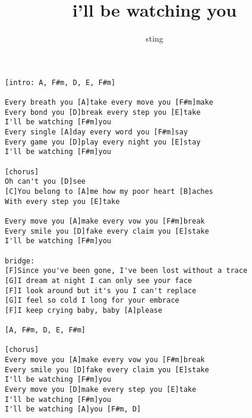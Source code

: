 \author{sting}
\title{i'll be watching you}
\maketitle
\begin{verbatim}
[intro: A, F#m, D, E, F#m]

Every breath you [A]take every move you [F#m]make
Every bond you [D]break every step you [E]take
I'll be watching [F#m]you
Every single [A]day every word you [F#m]say
Every game you [D]play every night you [E]stay
I'll be watching [F#m]you

[chorus]
Oh can't you [D]see
[C]You belong to [A]me how my poor heart [B]aches
With every step you [E]take

Every move you [A]make every vow you [F#m]break
Every smile you [D]fake every claim you [E]stake
I'll be watching [F#m]you

bridge:
[F]Since you've been gone, I've been lost without a trace
[G]I dream at night I can only see your face
[F]I look around but it's you I can't replace
[G]I feel so cold I long for your embrace
[F]I keep crying baby, baby [A]please

[A, F#m, D, E, F#m]

[chorus]
Every move you [A]make every vow you [F#m]break
Every smile you [D]fake every claim you [E]stake
I'll be watching [F#m]you
Every move you [D]make every step you [E]take 
I'll be watching [F#m]you
I'll be watching [A]you [F#m, D]
\end{verbatim}